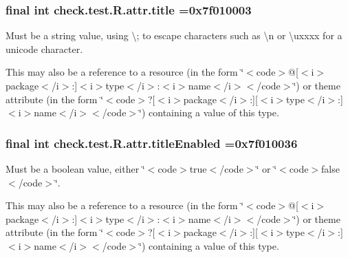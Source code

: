 \subsubsection[{title}]{\setlength{\rightskip}{0pt plus 5cm}final int check.\+test.\+R.\+attr.\+title =0x7f010003\hspace{0.3cm}{\ttfamily [static]}}\label{classcheck_1_1test_1_1_r_1_1attr_a002c5907c5484ce9f870aa21ac099f9b}
Must be a string value, using \textquotesingle{}\textbackslash{};\textquotesingle{} to escape characters such as \textquotesingle{}\textbackslash{}n\textquotesingle{} or \textquotesingle{}\textbackslash{}uxxxx\textquotesingle{} for a unicode character. 

This may also be a reference to a resource (in the form \char`\"{}$<$code$>$@\mbox{[}$<$i$>$package$<$/i$>$\+:\mbox{]}$<$i$>$type$<$/i$>$\+:$<$i$>$name$<$/i$>$$<$/code$>$\char`\"{}) or theme attribute (in the form \char`\"{}$<$code$>$?\mbox{[}$<$i$>$package$<$/i$>$\+:\mbox{]}\mbox{[}$<$i$>$type$<$/i$>$\+:\mbox{]}$<$i$>$name$<$/i$>$$<$/code$>$\char`\"{}) containing a value of this type. \hypertarget{classcheck_1_1test_1_1_r_1_1attr_aee85e0b8f8875713f0f0ae34e9641d08}{}
\subsubsection[{title\+Enabled}]{\setlength{\rightskip}{0pt plus 5cm}final int check.\+test.\+R.\+attr.\+title\+Enabled =0x7f010036\hspace{0.3cm}{\ttfamily [static]}}\label{classcheck_1_1test_1_1_r_1_1attr_aee85e0b8f8875713f0f0ae34e9641d08}
Must be a boolean value, either \char`\"{}$<$code$>$true$<$/code$>$\char`\"{} or \char`\"{}$<$code$>$false$<$/code$>$\char`\"{}. 

This may also be a reference to a resource (in the form \char`\"{}$<$code$>$@\mbox{[}$<$i$>$package$<$/i$>$\+:\mbox{]}$<$i$>$type$<$/i$>$\+:$<$i$>$name$<$/i$>$$<$/code$>$\char`\"{}) or theme attribute (in the form \char`\"{}$<$code$>$?\mbox{[}$<$i$>$package$<$/i$>$\+:\mbox{]}\mbox{[}$<$i$>$type$<$/i$>$\+:\mbox{]}$<$i$>$name$<$/i$>$$<$/code$>$\char`\"{}) containing a value of this type. \hypertarget{classcheck_1_1test_1_1_r_1_1attr_af0ece8636a362c616b298368dbfd014f}{}
